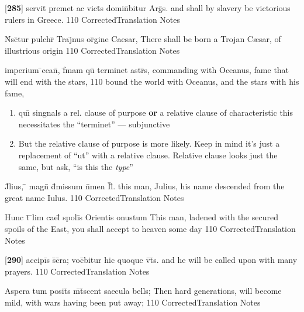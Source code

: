 \documentclass[]{book}
\begin{document}
\latline
  {[\textbf{285}] servit\={} premet ac vict\={\macron {\i}}s domin\={}bitur Arg\={\macron {\i}}s.}
  { and shall by slavery be victorious rulers in Greece. }
  {110}
  { CorrectedTranslation }
  { Notes }


\latline
  {N\={}sc\={}tur pulchr\={} Traj\={}nus or\={\macron {\i}}gine Caesar,}
  { There shall be born a Trojan C{\ae}sar, of illustrious origin }
  {110}
  { CorrectedTranslation }
  { Notes }


\latline
  {imperium \={}cean\={}, f\={}mam qu\={\macron {\i}} terminet astr\={\macron {\i}}s,}
  { commanding with Oceanus, fame that will end with the stars, }
  {110}
  { bound the world with Oceanus, and the stars with his fame, }
  { \begin{enumerate}
  	\item qu\={\i} singnals a rel. clause of purpose \textbf{or} a relative clause of characteristic  this necessitates the ``terminet'' --- subjunctive
  	\item But the relative clause of purpose is more likely.  Keep in mind it's just a replacement of ``ut'' with a relative clause.  Relative clause looks just the same, but ask, ``is this the \emph{type}''
  \end{enumerate} }


\latline
  {J\={}lius, \={} magn\={} d\={}missum n\={}men I\={}l\={}.}
  { this man, Julius, his name descended from the great name Iulus. }
  {110}
  { CorrectedTranslation }
  { Notes }


\latline
  {Hunc t\={} \={}lim cael\={} spoli\={\macron {\i}}s Orientis onustum}
  { This man, ladened with the secured spoils of the East, you shall accept to heaven some day }
  {110}
  { CorrectedTranslation }
  { Notes }


\latline
  {[\textbf{290}] accipi\={}s s\={}c\={}ra; voc\={}bitur hic quoque v\={}t\={\macron {\i}}s.}
  { and he will be called upon with many prayers. }
  {110}
  { CorrectedTranslation }
  { Notes }


\latline
  {Aspera tum posit\={\macron {\i}}s m\={\macron {\i}}t\={}scent saecula bell\={\macron {\i}}s;}
  { Then hard generations, will become mild, with wars having been put away; }
  {110}
  { CorrectedTranslation }
  { Notes }
\end{document}
